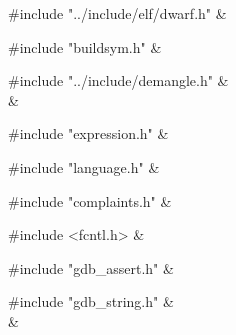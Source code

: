 \medskip
\begin{cxreftabi}
{\stt \#include "../include/elf/dwarf.h"} &\\
\end{cxreftabi}

\medskip
\begin{cxreftabi}
{\stt \#include "buildsym.h"} &\\
\end{cxreftabi}

\medskip
\begin{cxreftabi}
{\stt \#include "../include/demangle.h"} &\\
\hspace*{0.2in}{\stt \#include "../include/libiberty.h"} &\\
\end{cxreftabi}

\medskip
\begin{cxreftabi}
{\stt \#include "expression.h"} &\\
\end{cxreftabi}

\medskip
\begin{cxreftabi}
{\stt \#include "language.h"} &\\
\end{cxreftabi}

\medskip
\begin{cxreftabi}
{\stt \#include "complaints.h"} &\\
\end{cxreftabi}

\medskip
\begin{cxreftabi}
{\stt \#include <fcntl.h>} &\\
\end{cxreftabi}

\medskip
\begin{cxreftabi}
{\stt \#include "gdb\_assert.h"} &\\
\end{cxreftabi}

\medskip
\begin{cxreftabi}
{\stt \#include "gdb\_string.h"} &\\
\hspace*{0.2in}{\stt \#include <string.h>} &\\
\end{cxreftabi}


